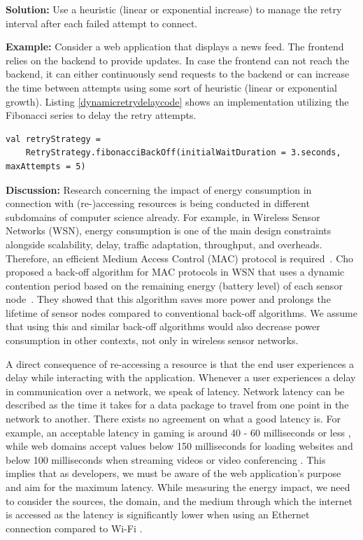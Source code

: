 \textbf{Solution:} Use a heuristic (\eg linear or exponential increase) to manage the retry interval after each failed attempt to connect.

\textbf{Example:} Consider a web application that displays a news feed. The frontend relies on the backend to provide updates. In case the frontend can not reach the backend, it can either continuously send requests to the backend or can increase the time between attempts using some sort of heuristic (\eg linear or exponential growth).  Listing \ref{dynamicretrydelaycode} shows an implementation utilizing the Fibonacci series to delay the retry attempts.

\begin{minipage}{0.95\linewidth}
    \begin{lstlisting}[caption={Example heuristics using the fibonacci series \cite{github-retry-demo}},label={dynamicretrydelaycode}]
    val retryStrategy =
    RetryStrategy.fibonacciBackOff(initialWaitDuration = 3.seconds, maxAttempts = 5)
    \end{lstlisting}
\end{minipage}

\textbf{Discussion:} Research concerning the impact of energy consumption in connection with (re-)accessing resources is being conducted in different subdomains of computer science already. For example, in Wireless Sensor Networks (WSN), energy consumption is one of the main design constraints alongside scalability, delay, traffic adaptation, throughput, and overheads. Therefore, an efficient Medium Access Control (MAC) protocol is required~\cite{Kaur2016}. Cho \etal proposed a back-off algorithm for MAC protocols in WSN that uses a dynamic contention period based on the remaining energy (\ie battery level) of each sensor node~\cite{Cho2006}. They showed that this algorithm saves more power and prolongs the lifetime of sensor nodes compared to conventional back-off algorithms. We assume that using this and similar back-off algorithms would also decrease power consumption in other contexts, not only in wireless sensor networks.

A direct consequence of re-accessing a resource is that the end user experiences a delay while interacting with the application. Whenever a user experiences a delay in communication over a network, we speak of latency. Network latency can be described as the time it takes for a data package to travel from one point in the network to another.  There exists no agreement on what a good latency is. For example, an acceptable latency in gaming is around 40 - 60 milliseconds or less \cite{gaming_latency},
 while web domains accept values below 150 milliseconds for loading websites \cite{website_latency}
and below 100 milliseconds
when streaming videos or video conferencing \cite{latency-video}. This implies that as developers, we must be aware of the web application's purpose and aim for the maximum latency. While measuring the energy impact, we need to consider the sources, the domain, and the medium through which the internet is accessed as the latency is significantly lower when using an Ethernet connection compared to Wi-Fi \cite{ethernet-vs-wifi}. 


